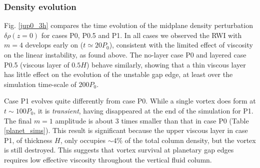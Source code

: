 
\subsubsection{Density evolution}%

Fig. \ref{jup0_3h} compares the time evolution of the midplane density
perturbation $\delta\rho(z=0)$ for cases P0, P0.5 and P1. In 
all cases we observed the RWI with $m=4$ develops early on ($t\simeq20P_0$),
consistent with the limited effect of viscosity on the linear
instability, as found above. 
The no-layer case P0 and layered case P0.5 (viscous layer of $0.5H$)
behave similarly, showing that a thin viscous layer has little effect
on the evolution of the unstable gap edge, at least over the
simulation time-scale of $200P_0$.  


Case P1 evolves quite
differently from case P0. While a single vortex does form at
$t\sim100P_0$, it is \emph{transient}, having disappeared at the end of
the simulation for P1. The final $m=1$ amplitude is about 3 times smaller
than that in case P0 (Table \ref{planet_sims}). This result is
significant because the upper viscous layer in case P1, of 
thickness $H$, only occupies $\sim4\%$ of the total column density, 
but the vortex is still destroyed. This suggests that vortex
survival at planetary gap edges requires low effective viscosity
throughout the vertical fluid column. 

